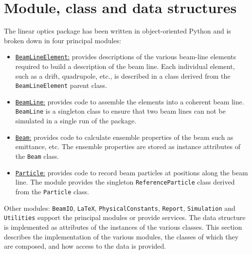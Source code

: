 \graphicspath{ {06-MCD/Figures/} }

\section{Module, class and data structures}

The linear optics package has been written in object-oriented Python
and is broken down in four principal modules:
\begin{itemize}
  \item \underline{\texttt{BeamLineElement}:} provides descriptions
    of the various beam-line elements required to build a description
    of the beam line.
    Each individual element, such as a drift, quadrupole, etc., is
    described in a class derived from the \texttt{BeamLineElement}
    parent class.
  \item \underline{\texttt{BeamLine}:} provides code to assemble the
    elements into a coherent beam line.
    \texttt{BeamLine} is a singleton class to ensure that two beam
    lines can not be simulated in a single run of the package.
  \item \underline{\texttt{Beam}:} provides code to calculate
    ensemble properties of the beam such as emittance, etc.
    The ensemble properties are stored as instance attributes of
    the \texttt{Beam} class.
  \item \underline{\texttt{Particle}:} provides code to record beam
    particles at positions along the beam line.
    The module provides the singleton \texttt{ReferenceParticle}
    class derived from the \texttt{Particle} class.
\end{itemize}
Other modules: \texttt{BeamIO}, \texttt{LaTeX},
\texttt{PhysicalConstants}, \texttt{Report}, \texttt{Simulation}
and \texttt{Utilities} support the principal modules or provide
services.
The data structure is implemented as attributes of the instances of the 
various classes.
This section describes the implementation of the various modules, the
classes of which they are composed, and how access to the data is
provided.

